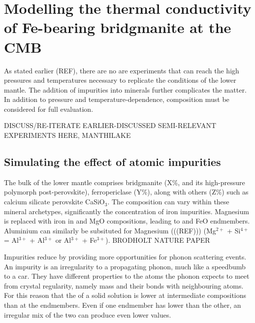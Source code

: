 \chapter{Modelling the thermal conductivity of Fe-bearing bridgmanite at the CMB} %

\label{Chapter4} %

As stated earlier (REF), there are no are experiments that can reach the high pressures and temperatures necessary to replicate the conditions of the lower mantle. The addition of impurities into minerals further complicates the matter. In addition to pressure and temperature-dependence, composition must be considered for full evaluation.

DISCUSS/RE-ITERATE EARLIER-DISCUSSED SEMI-RELEVANT EXPERIMENTS HERE, MANTHILAKE

\section{Simulating the effect of atomic impurities}

The bulk of the lower mantle comprises bridgmanite (X\%, and its high-pressure polymorph post-perovskite), ferropericlase (Y\%), along with others (Z\%) such as calcium silicate perovskite CaSiO$_3$. The composition can vary within these mineral archetypes, significantly the concentration of iron impurities. Magnesium is replaced with iron in 
\mgsios and MgO compositions, leading to \fesios and FeO endmembers. Aluminium can similarly be subsituted for Magnesium (((REF))) (Mg$^{2+}$ + Si$^{4+}$ = Al$^{3+}$ + Al$^{3+}$ or Al$^{3+}$ + Fe$^{3+}$).
BRODHOLT NATURE PAPER

Impurities reduce \tcs by providing more opportunities for phonon scattering events. An impurity is an irregularity to a propagating phonon, much like a speedbumb to a car. They have different properties to the atoms the phonon expects to meet from crystal regularity, namely mass and their bonds with neighbouring atoms. For this reason that the \tcs of a solid solution is lower at intermediate compositions than at the endmembers. Even if one endmember has lower \cs than the other, an irregular mix of the two can produce even lower values.



